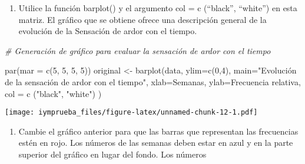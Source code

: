 \documentclass[
  12pt,
]{article}
\newenvironment{Shaded}{\begin{snugshade}}{\end{snugshade}}
\newcommand{\AttributeTok}[1]{\textcolor[rgb]{0.77,0.63,0.00}{#1}}
\newcommand{\CommentTok}[1]{\textcolor[rgb]{0.56,0.35,0.01}{\textit{#1}}}
\newcommand{\DecValTok}[1]{\textcolor[rgb]{0.00,0.00,0.81}{#1}}
\newcommand{\FunctionTok}[1]{\textcolor[rgb]{0.00,0.00,0.00}{#1}}
\newcommand{\NormalTok}[1]{#1}
\newcommand{\OtherTok}[1]{\textcolor[rgb]{0.56,0.35,0.01}{#1}}
\newcommand{\StringTok}[1]{\textcolor[rgb]{0.31,0.60,0.02}{#1}}
\providecommand{\tightlist}{%
  \setlength{\itemsep}{0pt}\setlength{\parskip}{0pt}}
\begin{document}
\begin{enumerate}
\def\labelenumi{\arabic{enumi}.}
\setcounter{enumi}{1}
\tightlist
\item
  Utilice la función barplot() y el argumento col = c (``black'',
  ``white'') en esta matriz. El gráfico que se obtiene ofrece una
  descripción general de la evolución de la Sensación de ardor con el
  tiempo.
\end{enumerate}

\begin{Shaded}
\begin{Highlighting}[]
\CommentTok{\# Generación de gráfico para evaluar la sensación de ardor con el tiempo}

\FunctionTok{par}\NormalTok{(}\AttributeTok{mar =} \FunctionTok{c}\NormalTok{(}\DecValTok{5}\NormalTok{, }\DecValTok{5}\NormalTok{, }\DecValTok{5}\NormalTok{, }\DecValTok{5}\NormalTok{))}
\NormalTok{original }\OtherTok{\textless{}{-}} \FunctionTok{barplot}\NormalTok{(data,}
        \AttributeTok{ylim=}\FunctionTok{c}\NormalTok{(}\DecValTok{0}\NormalTok{,}\DecValTok{4}\NormalTok{),}
        \AttributeTok{main=}\StringTok{"Evolución de la sensación de ardor con el tiempo"}\NormalTok{,}
        \AttributeTok{xlab=}\StringTok{\textquotesingle{}Semanas\textquotesingle{}}\NormalTok{,}
        \AttributeTok{ylab=}\StringTok{\textquotesingle{}Frecuencia relativa\textquotesingle{}}\NormalTok{,}
        \AttributeTok{col =} \FunctionTok{c}\NormalTok{ (}\StringTok{"black"}\NormalTok{, }\StringTok{"white"}\NormalTok{)}
\NormalTok{)}
\end{Highlighting}
\end{Shaded}

\texttt{[image: iymprueba\_files/figure-latex/unnamed-chunk-12-1.pdf]}

\begin{enumerate}
\def\labelenumi{\arabic{enumi}.}
\setcounter{enumi}{2}
\tightlist
\item
  Cambie el gráfico anterior para que las barras que representan las
  frecuencias estén en rojo. Los números de las semanas deben estar en
  azul y en la parte superior del gráfico en lugar del fondo. Los
  números
\end{enumerate}
\end{document}
